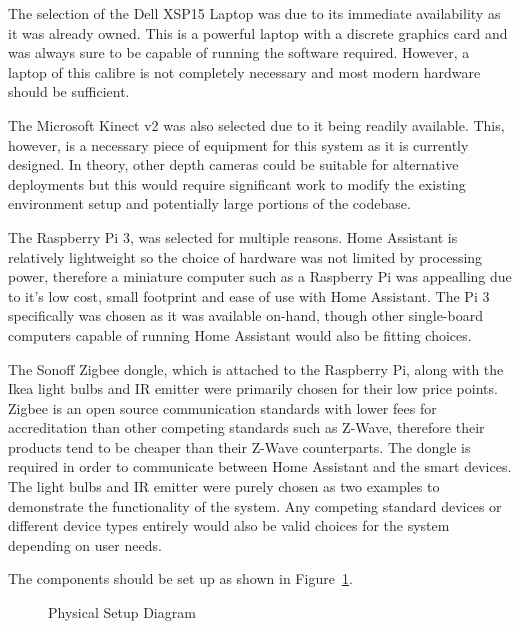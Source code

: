 The selection of the Dell XSP15 Laptop was due to its immediate availability as it was already owned.
This is a powerful laptop with a discrete graphics card and was always sure to be capable of running the software required.
However, a laptop of this calibre is not completely necessary and most modern hardware should be sufficient.

The Microsoft Kinect v2 was also selected due to it being readily available.
This, however, is a necessary piece of equipment for this system as it is currently designed.
In theory, other depth cameras could be suitable for alternative deployments but this would require significant work to modify the existing environment setup and potentially large portions of the codebase.

The Raspberry Pi 3, was selected for multiple reasons.
Home Assistant is relatively lightweight so the choice of hardware was not limited by processing power, therefore a miniature computer such as a Raspberry Pi was appealling due to it's low cost, small footprint and ease of use with Home Assistant.
The Pi 3 specifically was chosen as it was available on-hand, though other single-board computers capable of running Home Assistant would also be fitting choices.

The Sonoff Zigbee dongle, which is attached to the Raspberry Pi, along with the Ikea light bulbs and IR emitter were primarily chosen for their low price points.
Zigbee is an open source communication standards with lower fees for accreditation than other competing standards such as Z-Wave, therefore their products tend to be cheaper than their Z-Wave counterparts.
The dongle is required in order to communicate between Home Assistant and the smart devices.
The light bulbs and IR emitter were purely chosen as two examples to demonstrate the functionality of the system.
Any competing standard devices or different device types entirely would also be valid choices for the system depending on user needs.

The components should be set up as shown in Figure~\ref{fig:physical_setup_diagram}.

\begin{figure}[H]
    \caption{Physical Setup Diagram}
    \label{fig:physical_setup_diagram}
\end{figure}

